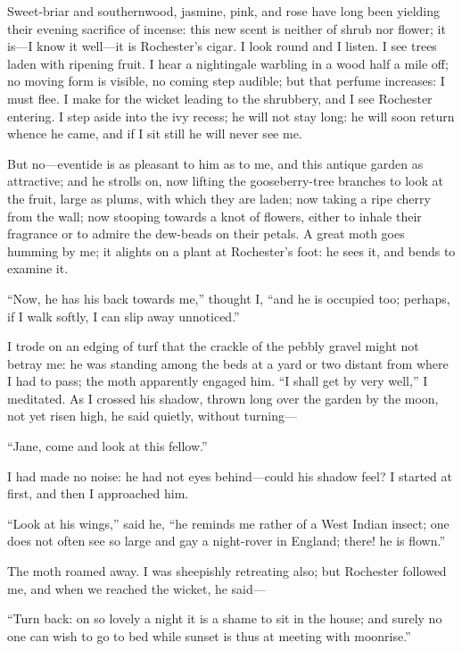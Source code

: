 Sweet-briar and southernwood, jasmine, pink, and rose have long been
yielding their evening sacrifice of incense: this new scent is neither
of shrub nor flower; it is---I know it well---it is \Mr{} Rochester's
cigar. I look round and I listen. I see trees laden with ripening
fruit. I hear a nightingale warbling in a wood half a mile off; no
moving form is visible, no coming step audible; but that perfume
increases: I must flee. I make for the wicket leading to the shrubbery,
and I see \Mr{} Rochester entering. I step aside into the ivy recess; he
will not stay long: he will soon return whence he came, and if I sit
still he will never see me.

But no---eventide is as pleasant to him as to me, and this antique
garden as attractive; and he strolls on, now lifting the gooseberry-tree
branches to look at the fruit, large as plums, with which they are
laden; now taking a ripe cherry from the wall; now stooping towards a
knot of flowers, either to inhale their fragrance or to admire the
dew-beads on their petals. A great moth goes humming by me; it alights
on a plant at \Mr{} Rochester's foot: he sees it, and bends to examine it.

\enquote{Now, he has his back towards me,} thought I, \enquote{and he is
	occupied too; perhaps, if I walk softly, I can slip away unnoticed.}

I trode on an edging of turf that the crackle of the pebbly gravel might
not betray me: he was standing among the beds at a yard or two distant
from where I had to pass; the moth apparently engaged him. \enquote{I
	shall get by very well,} I meditated. As I crossed his shadow, thrown
long over the garden by the moon, not yet risen high, he said quietly,
without turning---

\enquote{Jane, come and look at this fellow.}

I had made no noise: he had not eyes behind---could his shadow feel? I
started at first, and then I approached him.

\enquote{Look at his wings,} said he, \enquote{he reminds me rather of a
	West Indian insect; one does not often see so large and gay a
	night-rover in England; there! he is flown.}

The moth roamed away. I was sheepishly retreating also; but \Mr{}
Rochester followed me, and when we reached the wicket, he said---

\enquote{Turn back: on so lovely a night it is a shame to sit in the
	house; and surely no one can wish to go to bed while sunset is thus at
	meeting with moonrise.}

